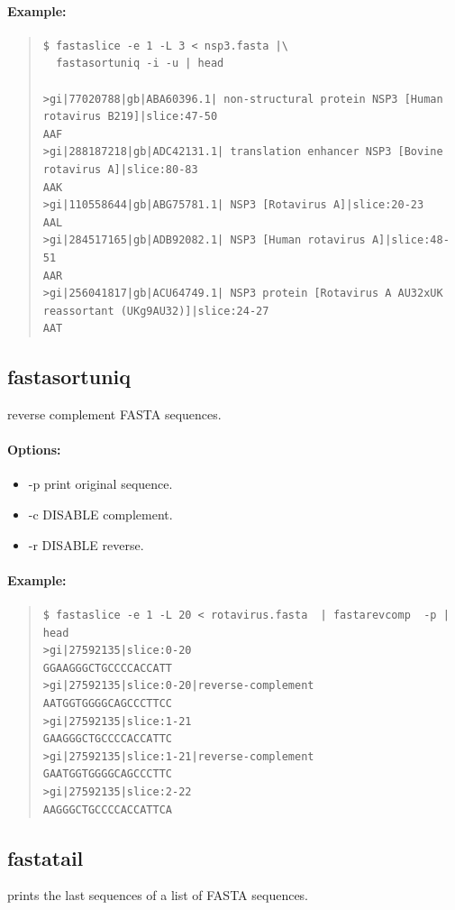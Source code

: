 \documentclass[12pt]{article}
\begin{document}
\paragraph{Example:}
\begin{quote}
\begin{verbatim}
$ fastaslice -e 1 -L 3 < nsp3.fasta |\
  fastasortuniq -i -u | head

>gi|77020788|gb|ABA60396.1| non-structural protein NSP3 [Human rotavirus B219]|slice:47-50
AAF
>gi|288187218|gb|ADC42131.1| translation enhancer NSP3 [Bovine rotavirus A]|slice:80-83
AAK
>gi|110558644|gb|ABG75781.1| NSP3 [Rotavirus A]|slice:20-23
AAL
>gi|284517165|gb|ADB92082.1| NSP3 [Human rotavirus A]|slice:48-51
AAR
>gi|256041817|gb|ACU64749.1| NSP3 protein [Rotavirus A AU32xUK reassortant (UKg9AU32)]|slice:24-27
AAT

\end{verbatim}
\end{quote}


\subsection{fastasortuniq}
reverse complement FASTA sequences.
\paragraph{Options:}
\begin{itemize}
\item-p print original sequence.
\item-c DISABLE complement.
\item-r DISABLE reverse.
\end{itemize}
\paragraph{Example:}
\begin{quote}
\begin{verbatim}
$ fastaslice -e 1 -L 20 < rotavirus.fasta  | fastarevcomp  -p | head
>gi|27592135|slice:0-20
GGAAGGGCTGCCCCACCATT
>gi|27592135|slice:0-20|reverse-complement
AATGGTGGGGCAGCCCTTCC
>gi|27592135|slice:1-21
GAAGGGCTGCCCCACCATTC
>gi|27592135|slice:1-21|reverse-complement
GAATGGTGGGGCAGCCCTTC
>gi|27592135|slice:2-22
AAGGGCTGCCCCACCATTCA
\end{verbatim}
\end{quote}

\subsection{fastatail}
prints the last sequences of a list of FASTA sequences.
\end{document}
